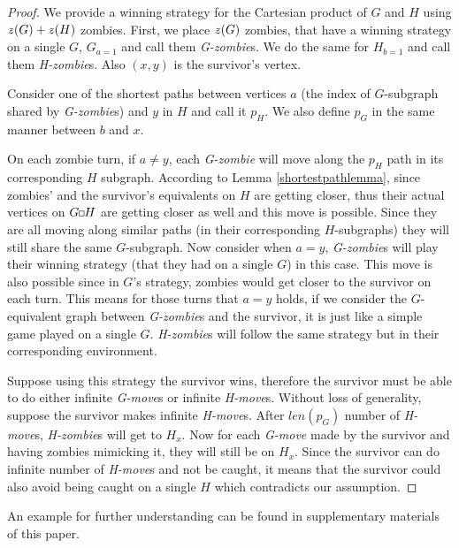 \documentclass[1p]{elsarticle}
\newcommand{\zn}{\ooalign{$z$\cr\hfil\rule[.5ex]{.2em}{.08ex}\hfil\cr}}
\newcommand{\sq}[1][black]{%
\begin{tikzpicture}                                                           
  \draw[#1] (2pt,0pt) -- (6pt,0pt);   
  \draw[#1] (2pt,0pt) -- (2pt,4pt);    
  \draw[#1] (2pt,4pt) -- (6pt,4pt);   
  \draw[#1] (6pt,0pt) -- (6pt,4pt);
\end{tikzpicture}%
}
\begin{document}
\begin{proof}
	We provide a winning strategy for the Cartesian product of $G$ and $H$ using $\zn(G)+\zn(H)$ zombies. First, we place
	$\zn(G)$ zombies, that have a winning strategy on a single $G$, $G_{a = 1}$ and call them {\it G-zombie}s. We do the
	same for $H_{b = 1}$ and call them {\it H-zombie}s. Also $(x,y)$ is the survivor's vertex.


	Consider one of the shortest paths between vertices $a$ (the index of $G$-subgraph shared by {\it G-zombie}s) and
	$y$ in $H$ and call it $p_H$. We also define $p_G$ in the same manner between $b$ and $x$.


	On each zombie turn, if $a \neq y$, each {\it G-zombie} will move along the $p_H$ path in its corresponding $H$
	subgraph. According to Lemma \ref{shortestpathlemma}, since zombies' and the survivor's equivalents on $H$ are
	getting closer, thus their actual vertices on $G \sq H$ are getting closer as well and this move is possible. Since
	they are all moving along similar paths (in their corresponding $H$-subgraphs) they will still share the same
	$G$-subgraph. Now consider when $a = y$, {\it G-zombie}s will play their winning strategy (that they had on a single
	$G$) in this case. This move is also possible since in $G$'s strategy, zombies would get closer to the survivor on
	each turn. This means for those turns that $a=y$ holds, if we consider the $G$-equivalent graph between {\it
	G-zombie}s and the survivor, it is just like a simple game played on a single $G$. {\it H-zombie}s will follow the
	same strategy but in their corresponding environment.
	
	
	Suppose using this strategy the survivor wins, therefore the survivor must be able to do either infinite {\it
	G-move}s or infinite {\it H-move}s. Without loss of generality, suppose the survivor makes infinite {\it H-move}s.
	After $len(p_G)$ number of {\it H-move}s, {\it H-zombie}s will get to $H_x$. Now for each {\it G-move} made by the
	survivor and having zombies mimicking it, they will still be on $H_x$. Since the survivor can do infinite number of {\it
	H-move}s and not be caught, it means that the survivor could also avoid being caught on a single $H$ which
	contradicts our assumption.
	
\end{proof}
An example for further understanding can be found in supplementary materials of this paper.
\end{document}

